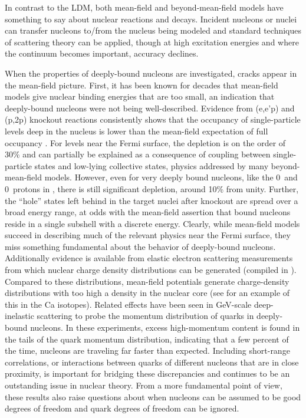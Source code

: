 
In contrast to the LDM, both mean-field and beyond-mean-field models have
something to say about nuclear reactions and decays. Incident nucleons or nuclei can
transfer nucleons to/from the nucleus being modeled and standard
techniques of scattering theory can be applied, though at high excitation
energies and where the continuum becomes important, accuracy declines.

When the properties of deeply-bound nucleons are investigated, cracks appear in the mean-field
picture. First, it has been known for decades that mean-field models give nuclear binding energies
that are too small, an indication that deeply-bound nucleons were not being well-described. Evidence
from (e,e'p) and (p,2p) knockout reactions 
consistently shows that the occupancy of single-particle levels deep in the nucleus is lower
than the mean-field expectation of full occupancy \cite{Mougey1980, Jacob1966, Jacob1973}.
For levels near the Fermi surface, the depletion is on the order of 30\% and can partially be
explained as a consequence of coupling between single-particle states and low-lying collective
states, physics addressed by many beyond-mean-field models. However, even for
very deeply bound
nucleons, like the 0\sOne\ and 0\pThree\ protons in \pbEight, there is still significant depletion,
around 10\% from unity. Further, the ``hole'' states left behind in the target nuclei after knockout are
spread over a broad energy range, at odds with the mean-field assertion that bound nucleons
reside in a single subshell with a discrete energy. Clearly, while mean-field models succeed in
describing much of the relevant physics near the Fermi surface, they miss something fundamental
about the behavior of deeply-bound nucleons. 
Additionally evidence is available from elastic electron scattering measurements from which nuclear
charge density distributions can be generated (compiled in \cite{DeVries1987}). Compared to these
distributions, mean-field potentials generate charge-density distributions with too high a density
in the nuclear core (see \cite{Brown1979} for an example of this in the Ca isotopes).
Related effects have been seen in GeV-scale deep-inelastic scattering to probe the momentum
distribution of quarks in deeply-bound nucleons. In these experiments, excess high-momentum
content is found in the tails of the quark momentum distribution, indicating that a few percent of the time, 
nucleons are traveling far faster than expected. Including short-range
correlations, or interactions between quarks of different nucleons that are in close proximity,
is important for bridging these discrepancies and continues to be an outstanding issue in nuclear 
theory. From a more fundamental point of view, these results also raise questions about when 
nucleons can be assumed to be good degrees of freedom and quark degrees of freedom can be ignored.

